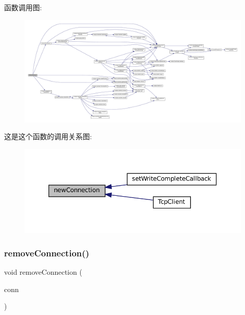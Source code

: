 函数调用图\+:
\nopagebreak
\begin{figure}[H]
\begin{center}
\leavevmode
\includegraphics[width=350pt]{classmuduo_1_1TcpClient_ae2e5d102f7a519e65019cd5f09acea72_cgraph}
\end{center}
\end{figure}
这是这个函数的调用关系图\+:
\nopagebreak
\begin{figure}[H]
\begin{center}
\leavevmode
\includegraphics[width=350pt]{classmuduo_1_1TcpClient_ae2e5d102f7a519e65019cd5f09acea72_icgraph}
\end{center}
\end{figure}
\mbox{\label{classmuduo_1_1TcpClient_ad9661c3f05443256c9439f812d1a7691}} 
\subsubsection{\texorpdfstring{remove\+Connection()}{removeConnection()}}
{\footnotesize\ttfamily void remove\+Connection (\begin{DoxyParamCaption}\item[{const \hyperlink{namespacemuduo_a40c45128e9700d337d92f3cbb8dd4a0a}{Tcp\+Connection\+Ptr} \&}]{conn }\end{DoxyParamCaption})\hspace{0.3cm}{\ttfamily [private]}}



